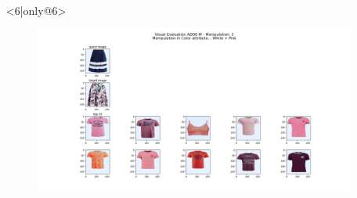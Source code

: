 \documentclass{beamer}
\begin{document}
\begin{frame}
\begin{itemize}
\begin{figure}[!h]
\begin{center}
 			\end{center}
\end{figure}
\item[] <6|only@6> 
\hspace{-20px}
\begin{figure}[!h]
 			\begin{center}
 			\hspace{-80px}
 			\includegraphics[scale=0.28]{"Immagini/3.6.png"}
 			\end{center}
\end{figure}
\end{itemize}
\end{frame}
\end{document}
